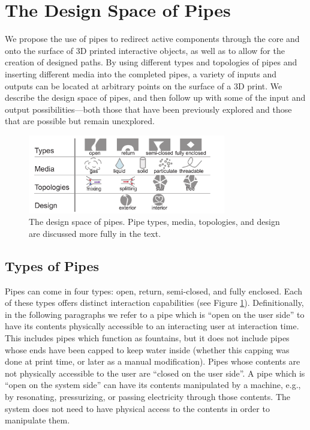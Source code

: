 \section{The Design Space of Pipes}

We propose the use of pipes to redirect active components through the core and onto the surface of 3D printed interactive objects, as well as to allow for the creation of designed paths.  By using different types and topologies of pipes and inserting different media into the completed pipes, a variety of inputs and outputs can be located at arbitrary points on the surface of a 3D print.  We describe the design space of pipes, and then follow up with some of the input and output possibilities---both those that have been previously explored and those that are possible but remain unexplored.

\begin{figure}[h]
\centering
    \includegraphics[width=3.4in]{figures/tubespace.pdf}
\caption{The design space of pipes.  Pipe types, media, topologies, and design are discussed more fully in the text.}
\label{fig:pipespace}
\end{figure}

\subsection{Types of Pipes}

Pipes can come in four types: open, return, semi-closed, and fully enclosed.  Each of these types offers distinct interaction capabilities (see Figure \ref{fig:pipespace}).  Definitionally, in the following paragraphs we refer to a pipe which is ``open on the user side'' to have its contents physically accessible to an interacting user at interaction time.  This includes pipes which function as fountains, but it does not include pipes whose ends have been capped to keep water inside (whether this capping was done at print time, or later as a manual modification).  Pipes whose contents are not physically accessible to the user are ``closed on the user side''.  A pipe which is ``open on the system side'' can have its contents manipulated by a machine, e.g., by resonating, pressurizing, or passing electricity through those contents.  The system does not need to have physical access to the contents in order to manipulate them.

